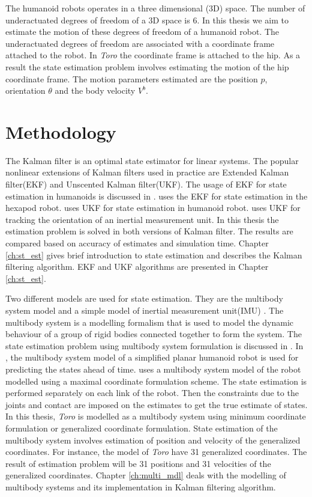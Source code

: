    The humanoid robots operates in a three dimensional (3D) space. The number of underactuated degrees of freedom of a 3D space is 6. 
   In this thesis we aim to estimate the motion of these degrees of freedom of a humanoid robot. The underactuated degrees of freedom are associated with a coordinate frame attached to the robot. In \emph{Toro} the coordinate frame is attached to the hip. As a result the state estimation problem involves estimating the motion of the hip coordinate frame. The motion parameters estimated are the position $p$, orientation $\theta$ and the body velocity $V^b$.

 \section{Methodology} 
The Kalman filter is an optimal state estimator for linear systems. The popular nonlinear extensions of Kalman filters used in practice are Extended Kalman filter(EKF) and Unscented Kalman filter(UKF). The usage of EKF for state estimation in humanoids is discussed in \citep{atk12}. \citep{bloe12} uses the EKF for state estimation in the hexapod robot. \citep{oli12} uses UKF for state estimation in humanoid robot. \citep{edg03} uses UKF for tracking the orientation of an inertial measurement unit. In this thesis the estimation problem is solved in both versions of Kalman filter. The results are compared based on accuracy of estimates and simulation time. Chapter \ref{ch:st_est} gives brief introduction to state estimation and describes the Kalman filtering algorithm. EKF and UKF algorithms are presented in Chapter \ref{ch:st_est}.

    Two different models are used for state estimation. They are the multibody system model and a simple model of  inertial measurement unit(IMU) \citep{bloe12}. The multibody system is a modelling formalism that is used to model the dynamic behaviour of a group of rigid bodies connected together to form the system. The state estimation problem using multibody system formulation is discussed in \citep{atk12}. In \citep{atk12}, the multibody system model of a simplified planar humanoid robot is used for predicting the states ahead of time. \citep{oli12} uses a multibody system model of the robot modelled using a maximal coordinate formulation scheme. The state estimation is performed separately on each link of the robot. Then the constraints due to the joints and contact are imposed on the estimates to get the true estimate of states. In this thesis, \emph{Toro} is modelled as a multibody system using minimum coordinate formulation or generalized coordinate formulation. State estimation of the multibody system involves estimation of position and velocity of the generalized coordinates. For instance, the model of \emph{Toro} have 31 generalized coordinates. The result of estimation problem will be 31 positions and 31 velocities of the generalized coordinates. Chapter \ref{ch:multi_mdl} deals with the modelling of multibody systems and its implementation in Kalman filtering algorithm. 
    
